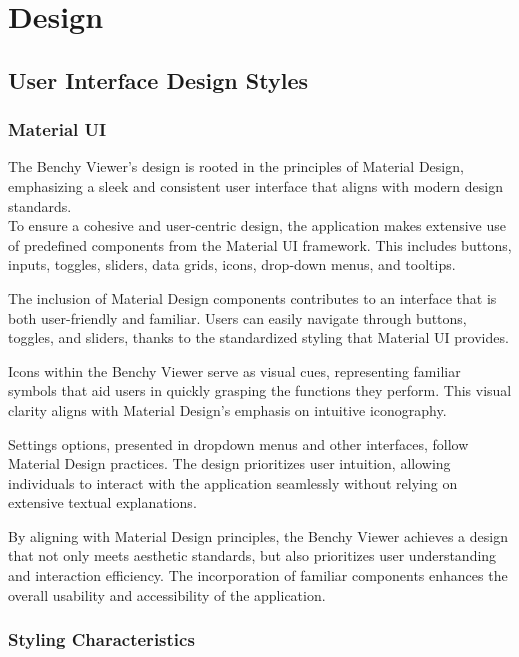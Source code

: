 
\section{Design}
\subsection{User Interface Design Styles}
\subsubsection{Material UI}
The Benchy Viewer's design is rooted in the principles of Material Design, emphasizing a sleek and consistent user interface that aligns with modern design standards.\\
To ensure a cohesive and user-centric design, the application makes extensive use of predefined components from the Material UI framework. This includes buttons, inputs, toggles, sliders, data grids, icons, drop-down menus, and tooltips.

The inclusion of Material Design components contributes to an interface that is both user-friendly and familiar. Users can easily navigate through buttons, toggles, and sliders, thanks to the standardized styling that Material UI provides.

Icons within the Benchy Viewer serve as visual cues, representing familiar symbols that aid users in quickly grasping the functions they perform. This visual clarity aligns with Material Design's emphasis on intuitive iconography.

Settings options, presented in dropdown menus and other interfaces, follow Material Design practices. The design prioritizes user intuition, allowing individuals to interact with the application seamlessly without relying on extensive textual explanations.

By aligning with Material Design principles, the Benchy Viewer achieves a design that not only meets aesthetic standards, but also prioritizes user understanding and interaction efficiency. The incorporation of familiar components enhances the overall usability and accessibility of the application.


\subsubsection{Styling Characteristics}


